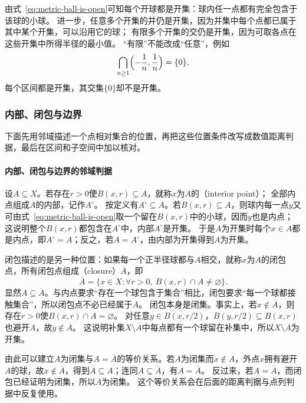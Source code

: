 由式~\eqref{eq:metric-ball-is-open}可知每个开球都是开集：球内任一点都有完全包含于该球的小球。
进一步，任意多个开集的并仍是开集，因为并集中每个点都已属于其中某个开集，可以沿用它的球；
有限多个开集的交仍是开集，因为可取各点在这些开集中所得半径的最小值。
“有限”不能改成“任意”，例如
\[
  \bigcap_{n\geq1}\Bigl(-\frac1n,\frac1n\Bigr)=\{0\},
\]
每个区间都是开集，其交集$\{0\}$却不是开集。

\subsubsection{内部、闭包与边界}
\label{sec:metric-interior-closure-boundary}

下面先用邻域描述一个点相对集合的位置，再把这些位置条件改写成数值距离判据，最后在区间和子空间中加以核对。

\paragraph{内部、闭包与边界的邻域判据}

设$A\subseteq X$。若存在$r>0$使$B(x,r)\subseteq A$，就称$x$为$A$的（interior point）；
全部内点组成$A$的内部，记作$A^\circ$。
按定义有$A^\circ\subseteq A$。若$B(x,r)\subseteq A$，则球内每一点$y$又可由式~\eqref{eq:metric-ball-is-open}取一个留在$B(x,r)$中的小球，因而$y$也是内点；
这说明整个$B(x,r)$都包含在$A^\circ$中，内部$A^\circ$是开集。
于是$A$为开集时每个$x\in A$都是内点，即$A^\circ=A$；反之，若$A=A^\circ$，由内部为开集得到$A$为开集。

闭包描述的是另一种位置：如果每一个正半径球都与$A$相交，就称$x$为$A$的闭包点，所有闭包点组成（closure）$\overline A$，即
\[
  \overline A=\{x\in X:\forall r>0,\ B(x,r)\cap A\neq\varnothing\}.
\]
显然$A\subseteq\overline A$。与内点要求“存在一个球包含于集合”相比，闭包要求“每一个球都接触集合”，所以闭包点不必已经属于$A$。
闭包本身是闭集。事实上，若$x\notin\overline A$，则存在$r>0$使$B(x,r)\cap A=\varnothing$。
对任意$y\in B(x,r/2)$，$B(y,r/2)\subseteq B(x,r)$也避开$A$，故$y\notin\overline A$。
这说明补集$X\setminus\overline A$中每点都有一个球留在补集中，所以$X\setminus\overline A$为开集。

由此可以建立$A$为闭集与$A=\overline A$的等价关系。若$A$为闭集而$x\notin A$，外点$x$拥有避开$A$的球，故$x\notin\overline A$，得到$\overline A\subseteq A$；连同$A\subseteq\overline A$，有$A=\overline A$。
反过来，若$A=\overline A$，而闭包已经证明为闭集，所以$A$为闭集。
这个等价关系会在后面的距离判据与点列判据中反复使用。

